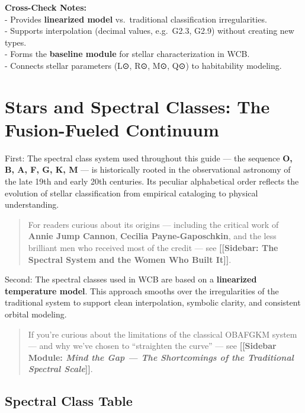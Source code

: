 \documentclass[
  letterpaper,
]{book}
\begin{document}
\textbf{Cross-Check Notes:}\\
- Provides \textbf{linearized model} vs.~traditional classification
irregularities.\\
- Supports interpolation (decimal values, e.g.~G2.3, G2.9) without
creating new types.\\
- Forms the \textbf{baseline module} for stellar characterization in
WCB.\\
- Connects stellar parameters (L⊙, R⊙, M⊙, Q⊙) to habitability modeling.

\chapter{Stars and Spectral Classes: The Fusion-Fueled
Continuum}\label{stars-and-spectral-classes-the-fusion-fueled-continuum}

First: The spectral class system used throughout this guide --- the
sequence \textbf{O, B, A, F, G, K, M} --- is historically rooted in the
observational astronomy of the late 19th and early 20th centuries. Its
peculiar alphabetical order reflects the evolution of stellar
classification from empirical cataloging to physical understanding.

\begin{quote}
For readers curious about its origins --- including the critical work of
\textbf{Annie Jump Cannon}, \textbf{Cecilia Payne-Gaposchkin}, and the
less brilliant men who received most of the credit --- see
\textbf{{[}{[}Sidebar: The Spectral System and the Women Who Built
It{]}{]}}.
\end{quote}

Second: The spectral classes used in WCB are based on a
\textbf{linearized temperature model}. This approach smooths over the
irregularities of the traditional system to support clean interpolation,
symbolic clarity, and consistent orbital modeling.

\begin{quote}
If you're curious about the limitations of the classical OBAFGKM system
--- and why we've chosen to ``straighten the curve'' --- see
\textbf{{[}{[}Sidebar Module: \emph{Mind the Gap --- The Shortcomings of
the Traditional Spectral Scale}{]}{]}}.
\end{quote}

\section{Spectral Class Table}\label{spectral-class-table}
\end{document}
